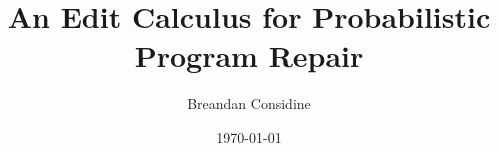 \documentclass[12pt,oneside]{book}
\title{An Edit Calculus for Probabilistic Program Repair}
\author{Breandan Considine}
\date{\today}
\begin{document}
\newcommand{\mcgillguidelines}{\href{https://www.mcgill.ca/gps/thesis/thesis-guidelines/preparation}{Official McGill Guidelines: }}


\begin{onehalfspacing}
\pagestyle{empty}

\cleardoublepage
\end{onehalfspacing}


\pagestyle{plain}



\clearpage

\cleardoublepage



\clearpage



\clearpage

\tableofcontents
\listoffigures
\listoftables
\clearpage






%

















\end{document}
